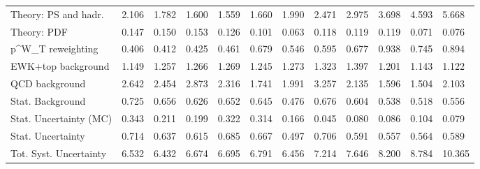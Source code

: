 \begin{tabular}{l|p{0.6cm}p{0.6cm}p{0.6cm}p{0.6cm}p{0.6cm}p{0.6cm}p{0.6cm}p{0.6cm}p{0.6cm}p{0.6cm}p{0.6cm}}
Theory: PS and hadr.                     & 2.106 & 1.782 & 1.600 & 1.559 & 1.660 & 1.990 & 2.471 & 2.975 & 3.698 & 4.593 & 5.668 \\
Theory: PDF                              & 0.147 & 0.150 & 0.153 & 0.126 & 0.101 & 0.063 & 0.118 & 0.119 & 0.119 & 0.071 & 0.076 \\
p^{W}_{T} reweighting                    & 0.406 & 0.412 & 0.425 & 0.461 & 0.679 & 0.546 & 0.595 & 0.677 & 0.938 & 0.745 & 0.894 \\
EWK+top background                       & 1.149 & 1.257 & 1.266 & 1.269 & 1.245 & 1.273 & 1.323 & 1.397 & 1.201 & 1.143 & 1.122 \\
QCD background                           & 2.642 & 2.454 & 2.873 & 2.316 & 1.741 & 1.991 & 3.257 & 2.135 & 1.596 & 1.504 & 2.103 \\
Stat. Background                         & 0.725 & 0.656 & 0.626 & 0.652 & 0.645 & 0.476 & 0.676 & 0.604 & 0.538 & 0.518 & 0.556 \\
Stat. Uncertainty (MC)                   & 0.343 & 0.211 & 0.199 & 0.322 & 0.314 & 0.166 & 0.045 & 0.080 & 0.086 & 0.104 & 0.079 \\
\hline
Stat. Uncertainty                        & 0.714 & 0.637 & 0.615 & 0.685 & 0.667 & 0.497 & 0.706 & 0.591 & 0.557 & 0.564 & 0.589 \\
\hline
Tot. Syst. Uncertainty                   & 6.532 & 6.432 & 6.674 & 6.695 & 6.791 & 6.456 & 7.214 & 7.646 & 8.200 & 8.784 & 10.365 \\
\hline
\end{tabular}
